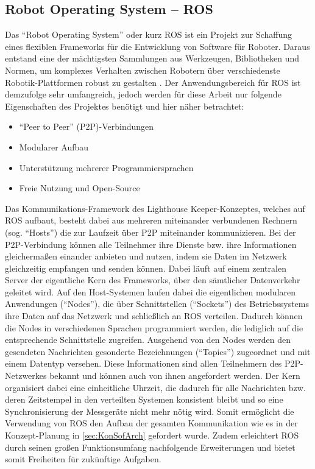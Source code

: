 \subsection{Robot Operating System -- ROS}
Das "`Robot Operating System"' oder kurz ROS ist ein Projekt zur Schaffung eines flexiblen Frameworks für die Entwicklung von Software für Roboter. Daraus entstand eine der mächtigsten Sammlungen aus Werkzeugen, Bibliotheken und Normen, um komplexes Verhalten zwischen Robotern über verschiedenste Robotik-Plattformen robust zu gestalten \cite{ROSErkl}. Der Anwendungsbereich für ROS ist demzufolge sehr umfangreich, jedoch werden für diese Arbeit nur folgende Eigenschaften \cite{ROSPaper} des Projektes benötigt und hier näher betrachtet:
\begin{itemize}
\item "`Peer to Peer"' (P2P)-Verbindungen
\item Modularer Aufbau
\item Unterstützung mehrerer Programmiersprachen
\item Freie Nutzung und Open-Source
\end{itemize}
Das Kommunikations-Framework des Lighthouse Keeper-Konzeptes, welches auf ROS aufbaut, besteht dabei aus mehreren miteinander verbundenen Rechnern (sog. "`Hosts"') die zur Laufzeit über P2P miteinander kommunizieren. Bei der P2P-Verbindung können alle Teilnehmer ihre Dienste bzw. ihre Informationen gleichermaßen einander anbieten und nutzen, indem sie Daten im Netzwerk gleichzeitig empfangen und senden können. Dabei läuft auf einem zentralen Server der eigentliche Kern des Frameworks, über den sämtlicher Datenverkehr geleitet wird. Auf den Host-Systemen laufen dabei die eigentlichen modularen Anwendungen ("`Nodes"'), die über Schnittstellen ("`Sockets"') des Betriebssystems ihre Daten auf das Netzwerk und schließlich an ROS verteilen. Dadurch können die Nodes in verschiedenen Sprachen programmiert werden, die lediglich auf die entsprechende Schnittstelle zugreifen. Ausgehend von den Nodes werden den gesendeten Nachrichten gesonderte Bezeichnungen ("`Topics"') zugeordnet und mit einem Datentyp versehen. Diese Informationen sind allen Teilnehmern des P2P-Netzwerkes bekannt und können auch von ihnen angefordert werden. Der Kern organisiert dabei eine einheitliche Uhrzeit, die dadurch für alle Nachrichten bzw. deren Zeitstempel in den verteilten Systemen konsistent bleibt und so eine Synchronisierung der Messgeräte nicht mehr nötig wird. Somit ermöglicht die Verwendung von ROS den Aufbau der gesamten Kommunikation wie es in der Konzept-Planung in \ref{sec:KonSofArch} gefordert wurde. Zudem erleichtert ROS durch seinen großen Funktionsumfang nachfolgende Erweiterungen und bietet somit Freiheiten für zukünftige Aufgaben.
